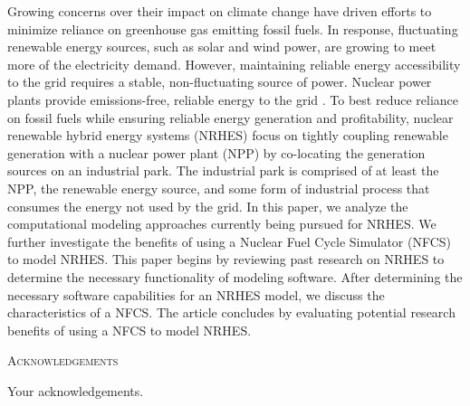 \documentclass[12pt]{UIdahoMastersThesis}
\begin{document}
Growing concerns over their impact on climate change have driven efforts to minimize reliance on greenhouse gas emitting fossil fuels. In response, fluctuating renewable energy sources, such as solar and wind power, are growing to meet more of the electricity demand. However, maintaining reliable energy accessibility to the grid requires a stable, non-fluctuating source of power. Nuclear power plants provide emissions-free, reliable energy to the grid \cite{IPCC}. To best reduce reliance on fossil fuels while ensuring reliable energy generation and profitability, nuclear renewable hybrid energy systems (NRHES) focus on tightly coupling renewable generation with a nuclear power plant (NPP) by co-locating the generation sources on an industrial park. The industrial park is comprised of at least the NPP, the renewable energy source, and some form of industrial process that consumes the energy not used by the grid. In this paper, we analyze the computational modeling approaches currently being pursued for NRHES. We further investigate the benefits of using a Nuclear Fuel Cycle Simulator (NFCS) to model NRHES. This paper begins by reviewing past research on NRHES to determine the necessary functionality of modeling software. After determining the necessary software capabilities for an NRHES model, we discuss the characteristics of a NFCS. The article concludes by evaluating potential research benefits of using a NFCS to model NRHES. 

\newpage


 \begin{center}
 	{\LARGE\textsc{Acknowledgements}}
 \end{center}
 
Your acknowledgements.

\newpage


   
   


\tableofcontents
\newpage
\end{document}
